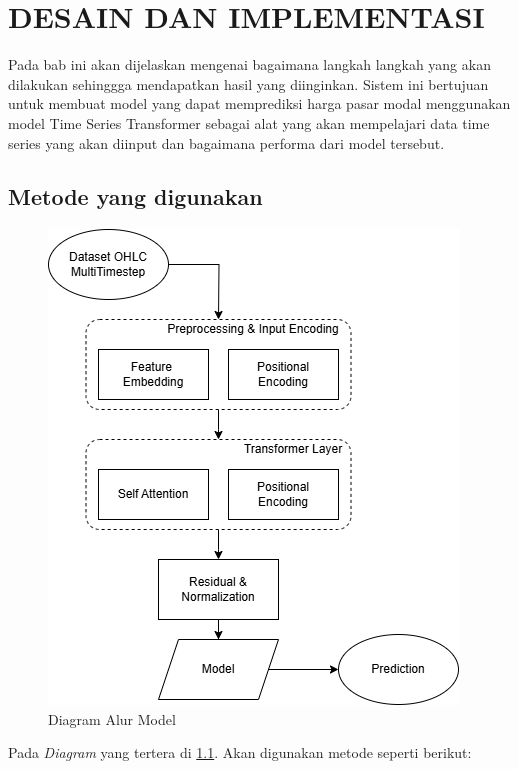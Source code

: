 \chapter{DESAIN DAN IMPLEMENTASI}
\label{chap:desainimplementasi}

Pada bab ini akan dijelaskan mengenai bagaimana langkah langkah yang akan dilakukan sehinggga mendapatkan hasil yang diinginkan. Sistem ini bertujuan untuk membuat model yang dapat memprediksi harga pasar modal menggunakan model Time Series Transformer sebagai alat yang akan mempelajari data time series yang akan diinput dan bagaimana performa dari model tersebut.
\section{Metode yang digunakan}


\begin{figure} [H] \centering
  \includegraphics[scale=0.7]{gambar/diagram_abel.png} 
    \caption{Diagram Alur Model}
    \label{fig:diagram_abel}
\end{figure}


Pada \emph{Diagram} yang tertera di \ref{fig:diagram_abel}. Akan digunakan metode seperti berikut: 

\newpage
